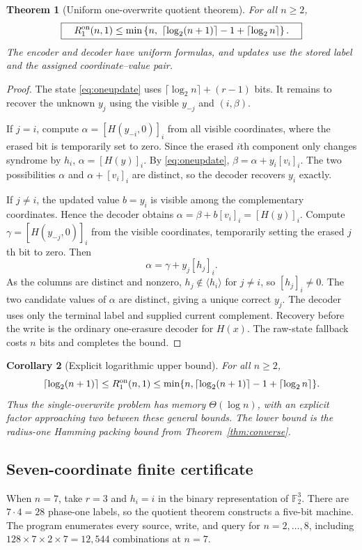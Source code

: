 \documentclass[11pt,a4paper]{article}
\newtheorem{theorem}{Theorem}[section]
\newtheorem{corollary}[theorem]{Corollary}
\newcommand{\F}{\mathbb F_2}
\begin{document}
\begin{theorem}[Uniform one-overwrite quotient theorem]\label{thm:one}
For all $n\ge2$,
\begin{equation}\label{eq:onebound}
\boxed{\quad
 R_1^{\rm on}(n,1)\le
 \min\left\{n,\ \lceil\log_2(n+1)\rceil-1+\lceil\log_2 n\rceil\right\}.
\quad}
\end{equation}
The encoder and decoder have uniform formulas, and updates use the stored label and the assigned coordinate--value pair.
\end{theorem}
\begin{proof}
The state \eqref{eq:oneupdate} uses $\lceil\log_2n\rceil+(r-1)$ bits. It remains to recover the unknown $y_j$ using the visible $y_{-j}$ and $(i,\beta)$.

If $j=i$, compute $\alpha=[H(y_{-i},0)]_i$ from all visible coordinates, where the erased bit is temporarily set to zero. Since the erased $i$th component only changes syndrome by $h_i$, $\alpha=[H(y)]_i$. By \eqref{eq:oneupdate}, $\beta=\alpha+y_i[v_i]_i$. The two possibilities $\alpha$ and $\alpha+[v_i]_i$ are distinct, so the decoder recovers $y_i$ exactly.

If $j\ne i$, the updated value $b=y_i$ is visible among the complementary coordinates. Hence the decoder obtains $\alpha=\beta+b[v_i]_i=[H(y)]_i$. Compute $\gamma=[H(y_{-j},0)]_i$ from the visible coordinates, temporarily setting the erased $j$th bit to zero. Then
\[
\alpha=\gamma+y_j[h_j]_i.
\]
As the columns are distinct and nonzero, $h_j\notin\langle h_i\rangle$ for $j\ne i$, so $[h_j]_i\ne0$. The two candidate values of $\alpha$ are distinct, giving a unique correct $y_j$. The decoder uses only the terminal label and supplied current complement. Recovery before the write is the ordinary one-erasure decoder for $H(x)$. The raw-state fallback costs $n$ bits and completes the bound.
\end{proof}

\begin{corollary}[Explicit logarithmic upper bound]\label{cor:one}
For all $n\ge2$,
\[
 \lceil\log_2(n+1)\rceil\le R_1^{\rm on}(n,1)
 \le\min\{n,\lceil\log_2(n+1)\rceil-1+\lceil\log_2n\rceil\}.
\]
Thus the single-overwrite problem has memory $\Theta(\log n)$, with an explicit factor approaching two between these general bounds. The lower bound is the radius-one Hamming packing bound from Theorem~\ref{thm:converse}.
\end{corollary}

\subsection{Seven-coordinate finite certificate}
When $n=7$, take $r=3$ and $h_i=i$ in the binary representation of $\F^3$. There are $7\cdot4=28$ phase-one labels, so the quotient theorem constructs a five-bit machine. The program  enumerates every source, write, and query for $n=2,\dots,8$, including $128\times7\times2\times7=12,544$ combinations at $n=7$.
\end{document}
